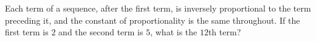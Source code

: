 Each term of a sequence, after the first term, is inversely proportional to the term preceding it, and the constant of proportionality is the same throughout. If the first term is $2$ and the second term is $5$, what is the $12$th term?
